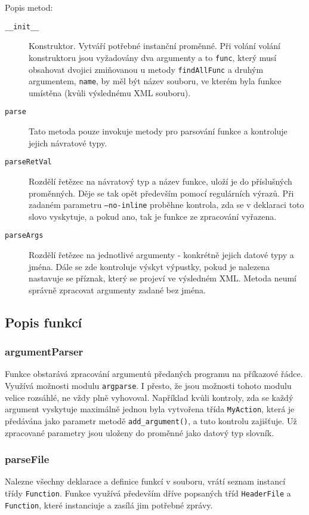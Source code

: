 \documentclass[a4paper, 10pt]{article}[19.04.2013]
\begin{document}
Popis metod:
\begin{description}
  \item [\texttt{\_\_init\_\_}] Konstruktor. Vytváří potřebné instanční proměnné.
  Při volání volání konstruktoru jsou vyžadovány dva argumenty a to \texttt{func},
  který musí obsahovat dvojici zmiňovanou u metody \texttt{findAllFunc} a druhým
  argumentem, \texttt{name}, by měl být název souboru, ve kterém byla funkce umístěna
  (kvůli výslednému XML souboru).
  \item [\texttt{parse}] Tato metoda pouze invokuje metody pro parsování funkce
  a kontroluje jejich návratové typy.
  \item [\texttt{parseRetVal}] Rozdělí řetězec na návratový typ a název funkce,
  uloží je do příslušných proměnných. Děje se tak opět především pomocí regulárních
  výrazů. Při zadaném parametru \texttt{---no-inline} proběhne kontrola, zda se v 
  deklaraci toto slovo vyskytuje, a pokud ano, tak je funkce ze zpracování vyřazena.
  \item [\texttt{parseArgs}] Rozdělí řetězec na jednotlivé argumenty - konkrétně
  jejich datové typy a jména. Dále se zde kontroluje výskyt výpustky, pokud je nalezena
  nastavuje se příznak, který se projeví ve výsledném XML. Metoda neumí správně zpracovat
  argumenty zadané bez jména.
\end{description}

\subsection*{Popis funkcí}
\subsubsection*{{\bf argumentParser}}
Funkce obstarává zpracování argumentů předaných programu na příkazové řádce.
Využívá možnosti modulu \texttt{argparse}. I přesto, že jsou možnosti tohoto
modulu velice rozsáhlé, ne vždy plně vyhovoval. Například kvůli kontroly, zda se
každý argument vyskytuje maximálně jednou byla vytvořena třída \texttt{MyAction},
která je předávána jako parametr metodě \texttt{add\_argument()}, a tuto kontrolu
zajišťuje. Už zpracované parametry jsou uloženy do proměnné jako datový
typ slovník.

\subsubsection*{{\bf parseFile}}
Nalezne všechny deklarace a definice funkcí v souboru, vrátí seznam instancí
třídy \texttt{Function}. Funkce využívá především dříve popsaných tříd
\texttt{HeaderFile} a \texttt{Function}, které instanciuje a zasílá jim
potřebné zprávy.
\end{document}
